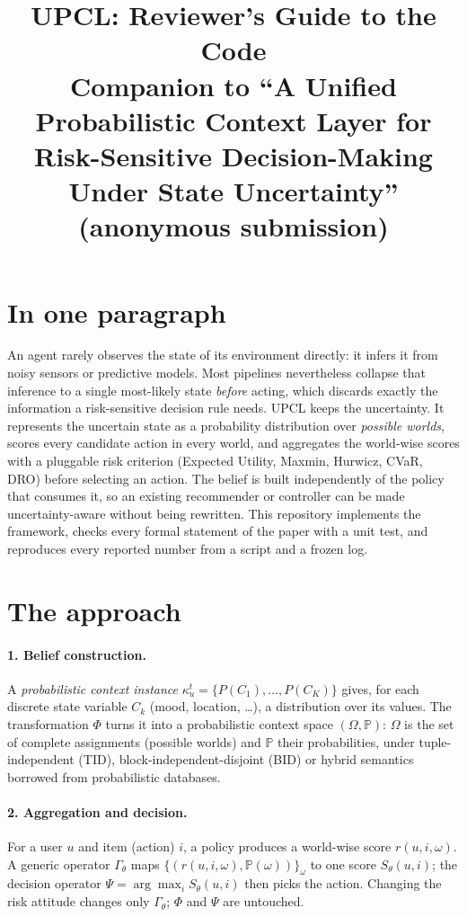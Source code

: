 \documentclass[11pt]{article}
\title{UPCL: Reviewer's Guide to the Code\\
\large Companion to ``A Unified Probabilistic Context Layer for\\
Risk-Sensitive Decision-Making Under State Uncertainty'' (anonymous submission)}
\author{}
\date{}
\begin{document}
\maketitle

\section{In one paragraph}

An agent rarely observes the state of its environment directly: it infers it from noisy sensors or predictive models. Most pipelines nevertheless collapse that inference to a single most-likely state \emph{before} acting, which discards exactly the information a risk-sensitive decision rule needs. UPCL keeps the uncertainty. It represents the uncertain state as a probability distribution over \emph{possible worlds}, scores every candidate action in every world, and aggregates the world-wise scores with a pluggable risk criterion (Expected Utility, Maxmin, Hurwicz, CVaR, DRO) before selecting an action. The belief is built independently of the policy that consumes it, so an existing recommender or controller can be made uncertainty-aware without being rewritten. This repository implements the framework, checks every formal statement of the paper with a unit test, and reproduces every reported number from a script and a frozen log.

\section{The approach}

\paragraph{1. Belief construction.} A \emph{probabilistic context instance} $\kappa_u^t=\{P(C_1),\dots,P(C_K)\}$ gives, for each discrete state variable $C_k$ (mood, location, \dots), a distribution over its values. The transformation $\Phi$ turns it into a probabilistic context space $(\Omega,\mathbb P)$: $\Omega$ is the set of complete assignments (possible worlds) and $\mathbb P$ their probabilities, under tuple-independent (TID), block-independent-disjoint (BID) or hybrid semantics borrowed from probabilistic databases.

\paragraph{2. Aggregation and decision.} For a user $u$ and item (action) $i$, a policy produces a world-wise score $r(u,i,\omega)$. A generic operator $\Gamma_\theta$ maps $\{(r(u,i,\omega),\mathbb P(\omega))\}_\omega$ to one score $S_\theta(u,i)$; the decision operator $\Psi=\arg\max_i S_\theta(u,i)$ then picks the action. Changing the risk attitude changes only $\Gamma_\theta$; $\Phi$ and $\Psi$ are untouched.
\end{document}
